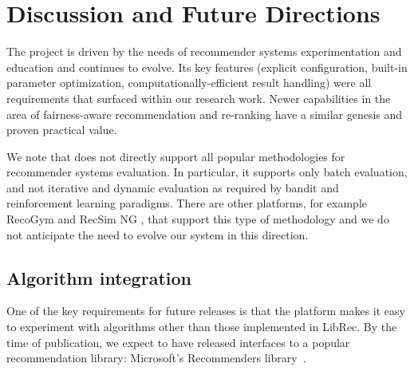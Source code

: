

                                 


\section{Discussion and Future Directions}
The \libauto{} project is driven by the needs of recommender systems experimentation and education and continues to evolve. Its key features (explicit configuration, built-in parameter optimization, computationally-efficient result handling) were all requirements that surfaced within our research work. Newer capabilities in the area of fairness-aware recommendation and re-ranking have a similar genesis and proven practical value. 

We note that \libauto{} does not directly support all popular methodologies for recommender systems evaluation. In particular, it supports only batch evaluation, and not iterative and dynamic evaluation as required by bandit and reinforcement learning paradigms. There are other platforms, for example RecoGym \cite{rohde2018recogym} and RecSim NG \cite{mladenov2021recsim}, that support this type of methodology and we do not anticipate the need to evolve our system in this direction. 

\subsection{Algorithm integration}
One of the key requirements for future releases is that the platform makes it easy to experiment with algorithms other than those implemented in LibRec. By the time of publication, we expect to have released interfaces to a popular recommendation library: Microsoft's Recommenders library~\cite{argyriou2020microsoft}. 


